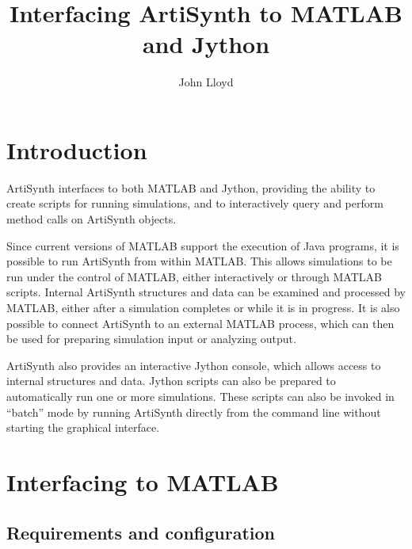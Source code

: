 \documentclass{article}
\begin{document}
\setcounter{tocdepth}{5}
\setcounter{secnumdepth}{3}

\title{Interfacing ArtiSynth to MATLAB and Jython}
\author{John Lloyd}

\iflatexml
\date{}
\fi

\maketitle

\iflatexml{\large\pubdate}\fi

\tableofcontents


\section{Introduction}

ArtiSynth interfaces to both MATLAB and Jython, providing the ability
to create scripts for running simulations, and to interactively query
and perform method calls on ArtiSynth objects.

Since current versions of MATLAB support the execution of Java
programs, it is possible to run ArtiSynth from within MATLAB.  This
allows simulations to be run under the control of MATLAB, either
interactively or through MATLAB scripts. Internal ArtiSynth structures
and data can be examined and processed by MATLAB, either after a
simulation completes or while it is in progress. It is also possible
to connect ArtiSynth to an external MATLAB process, which can then be
used for preparing simulation input or analyzing output.

ArtiSynth also provides an interactive Jython console, which allows
access to internal structures and data. Jython scripts can also be
prepared to automatically run one or more simulations. These scripts
can also be invoked in ``batch'' mode by running ArtiSynth directly
from the command line without starting the graphical interface.

\section{Interfacing to MATLAB}

\subsection{Requirements and configuration}
\label{Requirements:sec}
\end{document}
